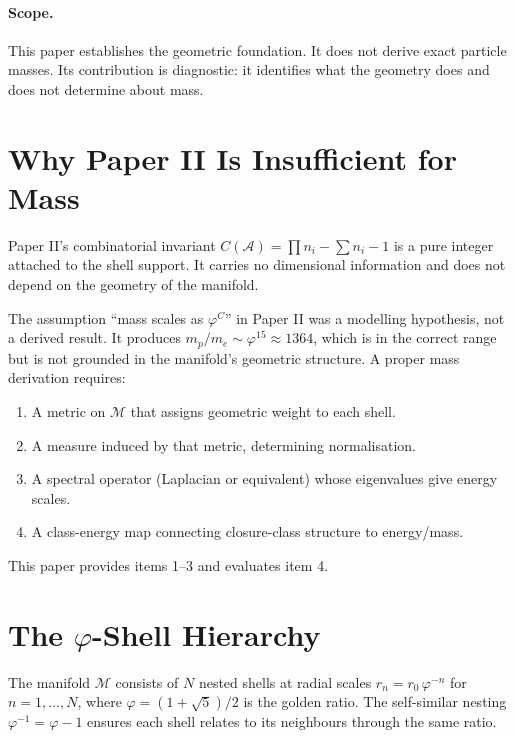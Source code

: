 \documentclass[12pt]{article}
\newcommand{\Mcal}{\mathcal{M}}
\newcommand{\Acal}{\mathcal{A}}
\newcommand{\phig}{\varphi}
\begin{document}
\paragraph{Scope.} This paper establishes the geometric foundation. It does not derive exact particle masses. Its contribution is diagnostic: it identifies what the geometry does and does not determine about mass.

\section{Why Paper II Is Insufficient for Mass}\label{sec:gap}

Paper II's combinatorial invariant $C(\Acal) = \prod n_i - \sum n_i - 1$ is a pure integer attached to the shell support. It carries no dimensional information and does not depend on the geometry of the manifold.

The assumption ``mass scales as $\phig^C$'' in Paper II was a modelling hypothesis, not a derived result. It produces $m_p/m_e \sim \phig^{15} \approx 1364$, which is in the correct range but is not grounded in the manifold's geometric structure. A proper mass derivation requires:
\begin{enumerate}
    \item A metric on $\Mcal$ that assigns geometric weight to each shell.
    \item A measure induced by that metric, determining normalisation.
    \item A spectral operator (Laplacian or equivalent) whose eigenvalues give energy scales.
    \item A class-energy map connecting closure-class structure to energy/mass.
\end{enumerate}

This paper provides items 1--3 and evaluates item 4.

\section{The $\phig$-Shell Hierarchy}\label{sec:shells}

The manifold $\Mcal$ consists of $N$ nested shells at radial scales $r_n = r_0\, \phig^{-n}$ for $n = 1, \ldots, N$, where $\phig = (1+\sqrt{5})/2$ is the golden ratio. The self-similar nesting $\phig^{-1} = \phig - 1$ ensures each shell relates to its neighbours through the same ratio.
\end{document}
